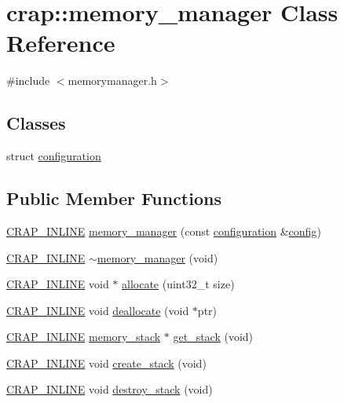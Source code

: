 \hypertarget{classcrap_1_1memory__manager}{}\section{crap\+:\+:memory\+\_\+manager Class Reference}
\label{classcrap_1_1memory__manager}


{\ttfamily \#include $<$memorymanager.\+h$>$}

\subsection*{Classes}
\begin{DoxyCompactItemize}
\item 
struct \hyperlink{structcrap_1_1memory__manager_1_1configuration}{configuration}
\end{DoxyCompactItemize}
\subsection*{Public Member Functions}
\begin{DoxyCompactItemize}
\item 
\hyperlink{config__x86_8h_a5a40526b8d842e7ff731509998bb0f1c}{C\+R\+A\+P\+\_\+\+I\+N\+L\+I\+N\+E} \hyperlink{classcrap_1_1memory__manager_a93051d0ffc02d2ab63a57b2017f09d3a}{memory\+\_\+manager} (const \hyperlink{structcrap_1_1memory__manager_1_1configuration}{configuration} \&\hyperlink{unittests_2source_2configuration_8cpp_ab299729ec441e3eaf9b96a1eb763e02f}{config})
\item 
\hyperlink{config__x86_8h_a5a40526b8d842e7ff731509998bb0f1c}{C\+R\+A\+P\+\_\+\+I\+N\+L\+I\+N\+E} \hyperlink{classcrap_1_1memory__manager_ada901cbb868877d6d9af948281d24f07}{$\sim$memory\+\_\+manager} (void)
\item 
\hyperlink{config__x86_8h_a5a40526b8d842e7ff731509998bb0f1c}{C\+R\+A\+P\+\_\+\+I\+N\+L\+I\+N\+E} void $\ast$ \hyperlink{classcrap_1_1memory__manager_aae41530d552578aa6d78ffec96dec69e}{allocate} (uint32\+\_\+t size)
\item 
\hyperlink{config__x86_8h_a5a40526b8d842e7ff731509998bb0f1c}{C\+R\+A\+P\+\_\+\+I\+N\+L\+I\+N\+E} void \hyperlink{classcrap_1_1memory__manager_a3c6568f92b8a533287697480b702e285}{deallocate} (void $\ast$ptr)
\item 
\hyperlink{config__x86_8h_a5a40526b8d842e7ff731509998bb0f1c}{C\+R\+A\+P\+\_\+\+I\+N\+L\+I\+N\+E} \hyperlink{classcrap_1_1memory__stack}{memory\+\_\+stack} $\ast$ \hyperlink{classcrap_1_1memory__manager_a4bdb547c679ac3549ff4f53d308c24d4}{get\+\_\+stack} (void)
\item 
\hyperlink{config__x86_8h_a5a40526b8d842e7ff731509998bb0f1c}{C\+R\+A\+P\+\_\+\+I\+N\+L\+I\+N\+E} void \hyperlink{classcrap_1_1memory__manager_a3a23f795ece223dfad4bc89af91c6743}{create\+\_\+stack} (void)
\item 
\hyperlink{config__x86_8h_a5a40526b8d842e7ff731509998bb0f1c}{C\+R\+A\+P\+\_\+\+I\+N\+L\+I\+N\+E} void \hyperlink{classcrap_1_1memory__manager_a482f48449775ae5fd889881ccfb61d08}{destroy\+\_\+stack} (void)
\end{DoxyCompactItemize}



